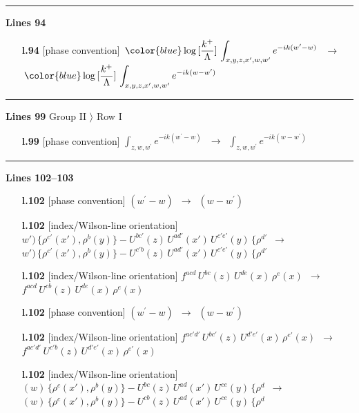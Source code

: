 \documentclass[10pt]{article}
\begin{document}
\noindent\rule{\linewidth}{0.3pt}\par\noindent\textbf{Lines 94} \par
\begin{itemize}[leftmargin=2.2em,itemsep=1pt,topsep=2pt]
\item[\textbf{l.94}] \textsf{\small [phase convention]} $\displaystyle \, {\color{blue}\log{[\frac{k^{+}}{\Lambda}]}}\,\int_{x,y,z,x^{\prime},w,w^{\prime}}e^{-ik(w^{\prime}-w)}\,$\ $\longrightarrow$\ $\displaystyle \, {\color{blue}\log{[\frac{k^{+}}{\Lambda}]}}\,\int_{x,y,z,x^{\prime},w,w^{\prime}}e^{-ik(w-w^{\prime})}\,$
\end{itemize}
\noindent\rule{\linewidth}{0.3pt}\par\noindent\textbf{Lines 99} \quad \textsf{Group II $\rangle$ Row I} \par
\begin{itemize}[leftmargin=2.2em,itemsep=1pt,topsep=2pt]
\item[\textbf{l.99}] \textsf{\small [phase convention]} $\displaystyle \int_{z,w,w^{\prime}} e^{-ik(w^{\prime}-w)}\,$\ $\longrightarrow$\ $\displaystyle \int_{z,w,w^{\prime}} e^{-ik(w-w^{\prime})}\,$
\end{itemize}
\noindent\rule{\linewidth}{0.3pt}\par\noindent\textbf{Lines 102--103} \par
\begin{itemize}[leftmargin=2.2em,itemsep=1pt,topsep=2pt]
\item[\textbf{l.102}] \textsf{\small [phase convention]} $\displaystyle (w^{\prime}-w)$\ $\longrightarrow$\ $\displaystyle (w-w^{\prime})$
\item[\textbf{l.102}] \textsf{\small [index/Wilson-line orientation]} $\displaystyle w')\,\{\rho^{c'}(x'),\rho^{b}(y)\}-U^{bc'}(z)\,U^{ad'}(x')\,U^{c'e'}(y)\, \{\rho^{d'}$\ $\longrightarrow$\ $\displaystyle w')\,\{\rho^{c'}(x'),\rho^{b}(y)\}-U^{c'b}(z)\,U^{ad'}(x')\,U^{c'e'}(y)\, \{\rho^{d'}$
\item[\textbf{l.102}] \textsf{\small [index/Wilson-line orientation]} $\displaystyle f^{acd}\, U^{bc}(z)\,U^{de}(x)\,\rho^{e}(x)$\ $\longrightarrow$\ $\displaystyle f^{acd}\, U^{cb}(z)\,U^{de}(x)\,\rho^{e}(x)$
\item[\textbf{l.102}] \textsf{\small [phase convention]} $\displaystyle (w^{\prime}-w)$\ $\longrightarrow$\ $\displaystyle (w-w^{\prime})$
\item[\textbf{l.102}] \textsf{\small [index/Wilson-line orientation]} $\displaystyle f^{ac'd'}\, U^{bc'}(z)\,U^{d'e'}(x)\,\rho^{e'}(x)$\ $\longrightarrow$\ $\displaystyle f^{ac'd'}\, U^{c'b}(z)\,U^{d'e'}(x)\,\rho^{e'}(x)$
\item[\textbf{l.102}] \textsf{\small [index/Wilson-line orientation]} $\displaystyle (w)\,\{\rho^{c}(x'),\rho^{b}(y)\}-U^{bc}(z)\,U^{ad}(x')\,U^{ce}(y)\, \{\rho^{d}$\ $\longrightarrow$\ $\displaystyle (w)\,\{\rho^{c}(x'),\rho^{b}(y)\}-U^{cb}(z)\,U^{ad}(x')\,U^{ce}(y)\, \{\rho^{d}$
\end{itemize}
\end{document}
